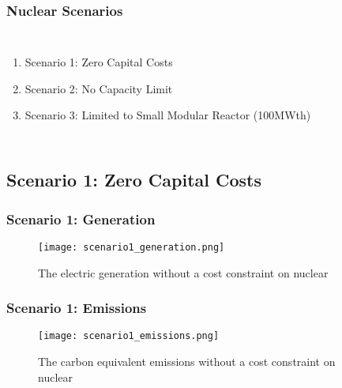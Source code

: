 \begin{frame}
  \frametitle{Nuclear Scenarios}
  \begin{columns}
    \column[t]{3cm}
    \begin{enumerate}
      \item Scenario 1: Zero Capital Costs
      \item Scenario 2: No Capacity Limit
      \item Scenario 3: Limited to Small Modular Reactor (100MWth)
    \end{enumerate}

    \column[t]{7cm}
    \begin{table}
      \centering
      \caption{Summary of Nuclear Scenarios. Costs from EIA and NEI reports \cite{desai_nuclear_2018}\cite{us_department_of_energy_capital_2016}.}
      \label{table:scenarios}
    \end{table}
  \end{columns}
\end{frame}

\subsection{Scenario 1: Zero Capital Costs}
\begin{frame}
  \frametitle{Scenario 1: Generation}
    \begin{figure}
      \texttt{[image: scenario1\_generation.png]}
      \caption{The electric generation without a cost constraint on nuclear}
      \label{fig:gen01}
    \end{figure}
\end{frame}
\begin{frame}
  \frametitle{Scenario 1: Emissions}
  \begin{figure}
    \texttt{[image: scenario1\_emissions.png]}
    \caption{The carbon equivalent emissions without a cost constraint on nuclear}
    \label{fig:emit01}
  \end{figure}
\end{frame}
